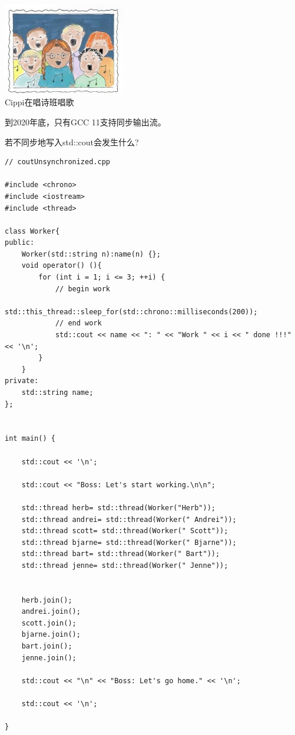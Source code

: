 \begin{center}
\includegraphics[width=0.4\textwidth]{content/3/chapter6/images/28.png}\\
Cippi在唱诗班唱歌
\end{center}

\begin{tcolorbox}[breakable,enhanced jigsaw,colback=blue!5!white,colframe=blue!75!black,title={编译器对同步输出流的支持}]
	
到2020年底，只有GCC 11支持同步输出流。
	
\end{tcolorbox}

若不同步地写入std::cout会发生什么?

\begin{lstlisting}[style=styleCXX]
// coutUnsynchronized.cpp

#include <chrono>
#include <iostream>
#include <thread>

class Worker{
public:
	Worker(std::string n):name(n) {};
	void operator() (){
		for (int i = 1; i <= 3; ++i) {
			// begin work
			std::this_thread::sleep_for(std::chrono::milliseconds(200));
			// end work
			std::cout << name << ": " << "Work " << i << " done !!!" << '\n';
		}
	}
private:
	std::string name;
};


int main() {

	std::cout << '\n';
	
	std::cout << "Boss: Let's start working.\n\n";
	
	std::thread herb= std::thread(Worker("Herb"));
	std::thread andrei= std::thread(Worker(" Andrei"));
	std::thread scott= std::thread(Worker(" Scott"));
	std::thread bjarne= std::thread(Worker(" Bjarne"));
	std::thread bart= std::thread(Worker(" Bart"));
	std::thread jenne= std::thread(Worker(" Jenne"));
	
	
	herb.join();
	andrei.join();
	scott.join();
	bjarne.join();
	bart.join();
	jenne.join();
	
	std::cout << "\n" << "Boss: Let's go home." << '\n';
	
	std::cout << '\n';

}
\end{lstlisting}


